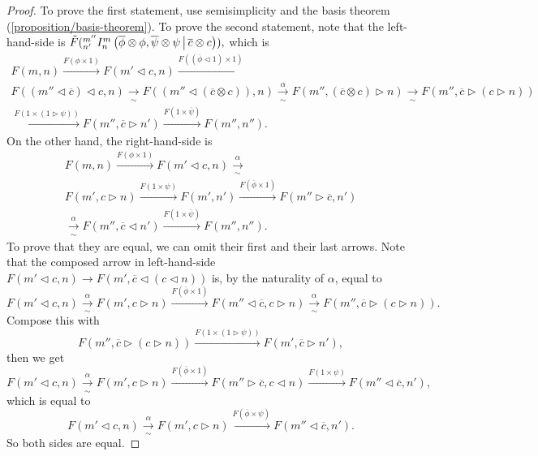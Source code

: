 \begin{proof}
  To prove the first statement, use semisimplicity and the basis theorem
  (\ref{proposition/basis-theorem}). %
  To prove the second statement, note that the left-hand-side is
  $\tilde{F}({}^{m''}_{n'} I^{m}_{n} \left( \overline{\phi} \otimes \phi, \overline{\psi} \otimes \psi \,\middle|\, \overline{c} \otimes c \right)),$ which is
  \begin{multline*}
    F(m,n)
    \xrightarrow{F(\phi \times 1)}
    F(m' \lhd c, n)
    \xrightarrow{F((\overline{\phi} \lhd 1) \times 1)} \\
    F((m'' \lhd \overline{c}) \lhd c, n)
    \xrightarrow[\sim]{}
    F((m'' \lhd (\overline{c} \otimes c)), n)
    \xrightarrow[\sim]{\alpha}
    F(m'', (\overline{c} \otimes c) \rhd n)
    \xrightarrow[\sim]{}
    F(m'', \overline{c} \rhd (c \rhd n)) \\
    \xrightarrow{F(1 \times (1 \rhd \psi))}
    F(m'', \overline{c} \rhd n')
    \xrightarrow{F(1 \times \overline{\psi})}
    F(m'',n'').
  \end{multline*}
  On the other hand, the right-hand-side is
  \begin{multline*}
    F(m,n)
    \xrightarrow{F(\phi \times 1)}
    F(m' \lhd c, n)
    \xrightarrow[\sim]{\alpha} \\
    F(m', c \rhd n)
    \xrightarrow{F(1 \times \psi)}
    F(m', n')
    \xrightarrow{F(\overline{\phi} \times 1)}
    F(m'' \rhd \overline{c}, n') \\
    \xrightarrow[\sim]{\alpha}
    F(m'', \overline{c} \lhd n')
    \xrightarrow{F(1 \times \overline{\psi})}
    F(m'',n'').
  \end{multline*}
  To prove that they are equal, we can omit their first and their last arrows. Note that the composed arrow in left-hand-side $F(m' \lhd c, n) \to F(m', \overline{c} \lhd (c \lhd n))$ is, by the naturality of $\alpha$, equal to
  \[
    F(m' \lhd c, n)
    \xrightarrow[\sim]{\alpha}
    F(m', c \rhd n)
    \xrightarrow{F(\overline{\phi} \times 1)}
    F(m'' \lhd \overline{c}, c \rhd n)
    \xrightarrow[\sim]{\alpha}
    F(m'', \overline{c} \rhd (c \rhd n)).
  \]
  Compose this with
  \[
    F(m'', \overline{c} \rhd (c \rhd n))
    \xrightarrow{F(1 \times (1 \rhd \psi))}
    F(m', \overline{c} \rhd n'),
  \]
  then we get
  \[
    F(m' \lhd c, n)
    \xrightarrow[\sim]{\alpha}
    F(m', c \rhd n)
    \xrightarrow{F(\overline{\phi} \times 1)}
    F(m'' \rhd \overline{c}, c \lhd n)
    \xrightarrow{F(1 \times \psi)}
    F(m'' \lhd \overline{c}, n'),
  \]
  which is equal to
  \[
    F(m' \lhd c, n)
    \xrightarrow[\sim]{\alpha}
    F(m', c \rhd n)
    \xrightarrow{F(\overline{\phi} \times \psi)}
    F(m'' \lhd \overline{c}, n').
  \]
  So both sides are equal.
\end{proof}

